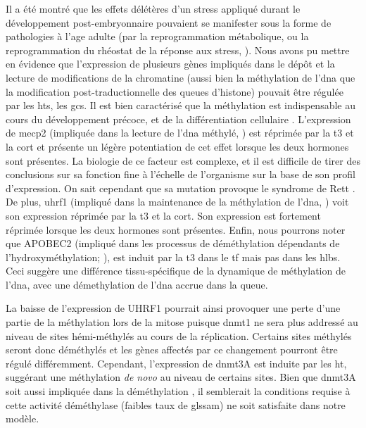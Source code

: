 \documentclass[../main.tex]{subfiles}
\begin{document}
Il a été montré que les effets délétères d'un stress appliqué durant le développement post-embryonnaire pouvaient se manifester sous la forme de pathologies à l'age adulte (par la reprogrammation métabolique, \citealp{Drake2012,Begum2013} ou la reprogrammation du rhéostat de la réponse aux stress, \citealp{Weaver2004}).
Nous avons pu mettre en évidence que l'expression de plusieurs gènes impliqués dans le dépôt et la lecture de modifications de la chromatine (aussi bien la méthylation de l'\gls{dna} que la modification post-traductionnelle des queues d'histone) pouvait être régulée par les \glspl{ht}, les \glspl{gc}.
Il est bien caractérisé que la méthylation est indispensable au cours du développement précoce, et de la différentiation cellulaire \citep{Monk1987,Meissner2008}.
L'expression de \gls{mecp2} (impliquée dans la lecture de l'\gls{dna} méthylé, \citealp{Zou2012}) est réprimée par la \gls{t3} et la \gls{cort} et présente un légère potentiation de cet effet lorsque les deux hormones sont présentes.
La biologie de ce facteur est complexe, et il est difficile de tirer des conclusions sur sa fonction fine à l’échelle de l'organisme sur la base de son profil d'expression.
On sait cependant que sa mutation provoque le syndrome de Rett \citep{Amir1999}.
De plus, \gls{uhrf1} (impliqué dans la maintenance de la méthylation de l'\gls{dna}, \citealp{Bostick2007,Liu2013a}) voit son expression réprimée par la \gls{t3} et la \gls{cort}.
Son expression est fortement réprimée lorsque les deux hormones sont présentes.
Enfin, nous pourrons noter que APOBEC2 (impliqué dans les processus de déméthylation dépendants de l'hydroxyméthylation; \citealp{Guo2011}), est induit par la \gls{t3} dans le \gls{tf} mais pas dans les \glspl{hlb}.
Ceci suggère une différence tissu-spécifique de la dynamique de méthylation de l'\gls{dna}, avec une démethylation de l'\gls{dna} accrue dans la queue.
\par
La baisse de l'expression de UHRF1 pourrait ainsi provoquer une perte d'une partie de la méthylation lors de la mitose puisque \gls{dnmt}1 ne sera plus addressé au niveau de sites hémi-méthylés au cours de la réplication.
Certains sites méthylés seront donc déméthylés et les gènes affectés par ce changement pourront être régulé différemment.
Cependant, l'expression de \gls{dnmt}3A est induite par les \gls{ht}, suggérant une méthylation \textit{de novo} au niveau de certains sites.
Bien que \gls{dnmt}3A soit aussi impliquée dans la déméthylation \citep{Wu2010}, il semblerait la conditions requise à cette activité déméthylase (faibles taux de gls{sam}) ne soit satisfaite dans notre modèle.
\end{document}
